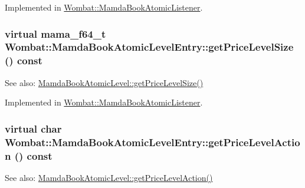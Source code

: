Implemented in \hyperlink{classWombat_1_1MamdaBookAtomicListener_a71f90d4ad1c3297f35676b7a4363488}{Wombat::Mamda\-Book\-Atomic\-Listener}.\hypertarget{classWombat_1_1MamdaBookAtomicLevelEntry_71d87bca919520a7167af8a3e4d81113}{
\subsubsection[getPriceLevelSize]{\setlength{\rightskip}{0pt plus 5cm}virtual mama\_\-f64\_\-t Wombat::Mamda\-Book\-Atomic\-Level\-Entry::get\-Price\-Level\-Size () const}}
\label{classWombat_1_1MamdaBookAtomicLevelEntry_71d87bca919520a7167af8a3e4d81113}


\begin{Desc}
\item[See also:]\hyperlink{classWombat_1_1MamdaBookAtomicLevel_bf9d9609a53a7344d6232ba70407d069}{Mamda\-Book\-Atomic\-Level::get\-Price\-Level\-Size()} \end{Desc}


Implemented in \hyperlink{classWombat_1_1MamdaBookAtomicListener_9bb50db078f337545e39e94cfcb89f0e}{Wombat::Mamda\-Book\-Atomic\-Listener}.\hypertarget{classWombat_1_1MamdaBookAtomicLevelEntry_fbb4050a6bc3e970e97b2014b48212ba}{
\subsubsection[getPriceLevelAction]{\setlength{\rightskip}{0pt plus 5cm}virtual char Wombat::Mamda\-Book\-Atomic\-Level\-Entry::get\-Price\-Level\-Action () const}}
\label{classWombat_1_1MamdaBookAtomicLevelEntry_fbb4050a6bc3e970e97b2014b48212ba}


\begin{Desc}
\item[See also:]\hyperlink{classWombat_1_1MamdaBookAtomicLevel_01015a77e67f21af4f1b53f25d6df2f0}{Mamda\-Book\-Atomic\-Level::get\-Price\-Level\-Action()} \end{Desc}


